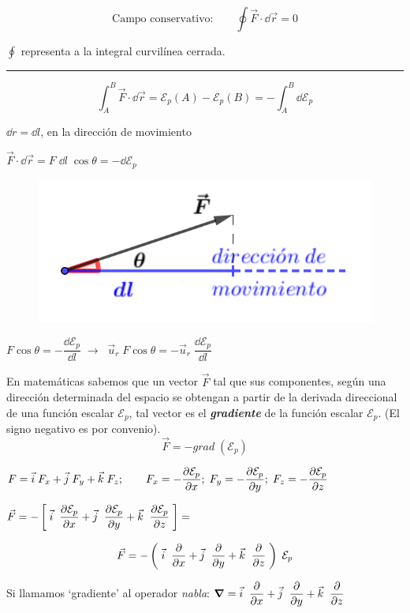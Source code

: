 $$ \text{Campo conservativo:}\qquad \oint \vec F \cdot \dd \vec r =0$$

\textcolor{gris}{$\oint$ representa a la integral curvilínea cerrada.}

\rule{150pt}{0.4pt} 

\begin{equation}
\int_A^B \vec F \cdot \dd \vec r = \mathcal E_p(A)- \mathcal E_p(B)=-\int_A^B\dd \mathcal E_p	
\end{equation}

\begin{multicols}{2}
$\dd r = \dd l$, en la dirección de movimiento

$\vec F\cdot \dd \vec r=F\; \dd l\; \cos \theta =-\dd \mathcal E_p $
\begin{figure}[H]
		\centering
		\includegraphics[width=.4\textwidth]{imagenes/imagenes03/T03IM12.png}
		\end{figure}
\end{multicols}

$F \cos \theta=- \dfrac{\dd \mathcal E_p}{\dd l} \; \to \;\; \vec u_r\;F \cos \theta=-\vec u_r\; \dfrac{\dd \mathcal E_p}{\dd l}$

En matemáticas sabemos que un vector $\vec F$ tal que sus componentes, según una dirección determinada del espacio se obtengan a partir de la derivada direccional de una función escalar $\mathcal E_p$, tal vector es el \textbf{\emph{gradiente}} de la función escalar $\mathcal E_p$. (El signo negativo es por convenio).
$$\vec F=-grad\;( \mathcal E_p)$$


$\displaystyle F=\vec i\; F_x +\vec j\; F_y +\vec k\; F_z; \qquad F_x=- \pdv{\mathcal E_p}{x};\; F_y=- \pdv{\mathcal E_p}{y};\; F_z=- \pdv{\mathcal E_p}{z}$


$\displaystyle \vec F=-\left[\;\vec i\;\;\pdv{\mathcal E_p}{x} + \vec j\;\;\pdv{\mathcal E_p}{y} + \vec k\;\;\pdv{\mathcal E_p}{z}\; \right] =$

\begin{equation}
\displaystyle \vec F=- \left( \;\vec i\;\;\pdv{x} + \vec j\;\;\pdv{y} + \vec k\;\;\pdv{z}\; \right)\; \mathcal E_p
\end{equation}

Si llamamos `gradiente' al operador \emph{nabla}: $\displaystyle \grad= \vec i\;\;\pdv{x} + \vec j\;\;\pdv{y} + \vec k\;\;\pdv{z}$

